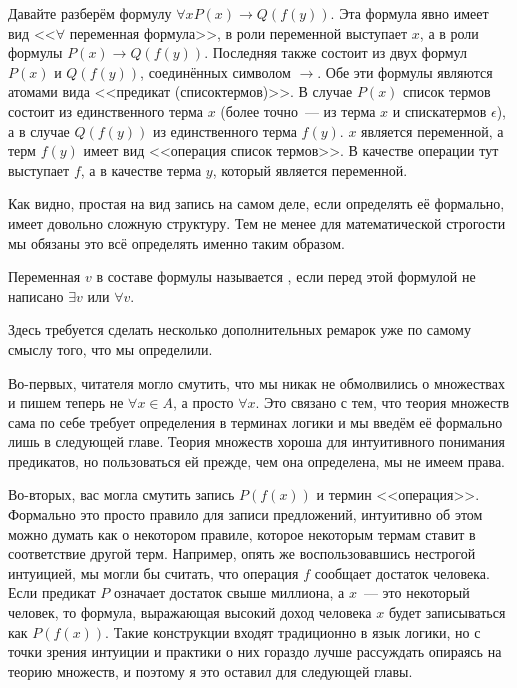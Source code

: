 \begin{example}
Давайте разберём формулу $\forall x P(x) \to Q(f(y))$. Эта формула явно имеет вид <<$\forall$ переменная формула>>, в роли переменной выступает $x$, а в роли формулы $P(x) \to Q(f(y))$. Последняя также состоит из двух формул $P(x)$ и $Q(f(y))$, соединённых символом $\to$. Обе эти формулы являются атомами вида <<предикат (списоктермов)>>. В случае $P(x)$ список термов состоит из единственного терма $x$ (более точно~--- из терма $x$ и спискатермов $\epsilon$), а в случае $Q(f(y))$ из единственного терма $f(y)$. $x$ является переменной, а терм $f(y)$ имеет вид <<операция список термов>>. В качестве операции тут выступает $f$, а в качестве терма $y$, который является переменной.
\end{example}

Как видно, простая на вид запись на самом деле, если определять её формально, имеет довольно сложную структуру. Тем не менее для математической строгости мы обязаны это всё определять именно таким образом.

\begin{definition}
Переменная $v$ в составе формулы называется , если перед этой формулой не написано $\exists v$ или $\forall v$.
\end{definition}

Здесь требуется сделать несколько дополнительных ремарок уже по самому смыслу того, что мы определили.

Во-первых, читателя могло смутить, что мы никак не обмолвились о множествах и пишем теперь не $\forall x\in A$, а просто $\forall x$. Это связано с тем, что теория множеств сама по себе требует определения в терминах логики и мы введём её формально лишь в следующей главе. Теория множеств хороша для интуитивного понимания предикатов, но пользоваться ей прежде, чем она определена, мы не имеем права.

Во-вторых, вас могла смутить запись $P(f(x))$ и термин <<операция>>. Формально это просто правило для записи предложений, интуитивно об этом можно думать как о некотором правиле, которое некоторым термам ставит в соответствие другой терм. Например, опять же воспользовавшись нестрогой интуицией, мы могли бы считать, что операция $f$ сообщает достаток человека. Если предикат $P$ означает достаток свыше миллиона, а $x$~--- это некоторый человек, то формула, выражающая высокий доход человека $x$ будет записываться как $P(f(x))$. Такие конструкции входят традиционно в язык логики, но с точки зрения интуиции и практики о них гораздо лучше рассуждать опираясь на теорию множеств, и поэтому я это оставил для следующей главы.

